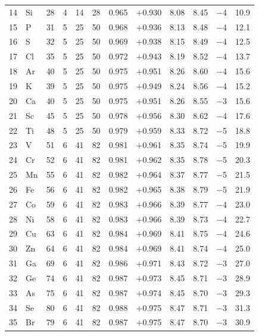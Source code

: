 \documentclass[twocolumn]{iopjournal}
\begin{document}
\begin{longtable}{r l r r r r r r r r r r}
14 & Si &  28 & 4 &  14 &  28 & 0.965 & $+$0.930 &  8.08 &  8.45 & $-$4  & 10.9 \\
15 & P  &  31 & 5 &  25 &  50 & 0.968 & $+$0.936 &  8.13 &  8.48 & $-$4  & 12.1 \\
16 & S  &  32 & 5 &  25 &  50 & 0.969 & $+$0.938 &  8.15 &  8.49 & $-$4  & 12.5 \\
17 & Cl &  35 & 5 &  25 &  50 & 0.972 & $+$0.943 &  8.19 &  8.52 & $-$4  & 13.7 \\
18 & Ar &  40 & 5 &  25 &  50 & 0.975 & $+$0.951 &  8.26 &  8.60 & $-$4  & 15.6 \\
19 & K  &  39 & 5 &  25 &  50 & 0.975 & $+$0.949 &  8.24 &  8.56 & $-$4  & 15.2 \\
20 & Ca &  40 & 5 &  25 &  50 & 0.975 & $+$0.951 &  8.26 &  8.55 & $-$3  & 15.6 \\
21 & Sc &  45 & 5 &  25 &  50 & 0.978 & $+$0.956 &  8.30 &  8.62 & $-$4  & 17.6 \\
22 & Ti &  48 & 5 &  25 &  50 & 0.979 & $+$0.959 &  8.33 &  8.72 & $-$5  & 18.8 \\
23 & V  &  51 & 6 &  41 &  82 & 0.981 & $+$0.961 &  8.35 &  8.74 & $-$5  & 19.9 \\
24 & Cr &  52 & 6 &  41 &  82 & 0.981 & $+$0.962 &  8.35 &  8.78 & $-$5  & 20.3 \\
25 & Mn &  55 & 6 &  41 &  82 & 0.982 & $+$0.964 &  8.37 &  8.77 & $-$5  & 21.5 \\
26 & Fe &  56 & 6 &  41 &  82 & 0.982 & $+$0.965 &  8.38 &  8.79 & $-$5  & 21.9 \\
27 & Co &  59 & 6 &  41 &  82 & 0.983 & $+$0.966 &  8.39 &  8.77 & $-$4  & 23.0 \\
28 & Ni &  58 & 6 &  41 &  82 & 0.983 & $+$0.966 &  8.39 &  8.73 & $-$4  & 22.7 \\
29 & Cu &  63 & 6 &  41 &  82 & 0.984 & $+$0.969 &  8.41 &  8.75 & $-$4  & 24.6 \\
30 & Zn &  64 & 6 &  41 &  82 & 0.984 & $+$0.969 &  8.41 &  8.74 & $-$4  & 25.0 \\
31 & Ga &  69 & 6 &  41 &  82 & 0.986 & $+$0.971 &  8.43 &  8.72 & $-$3  & 27.0 \\
32 & Ge &  74 & 6 &  41 &  82 & 0.987 & $+$0.973 &  8.45 &  8.71 & $-$3  & 28.9 \\
33 & As &  75 & 6 &  41 &  82 & 0.987 & $+$0.974 &  8.45 &  8.70 & $-$3  & 29.3 \\
34 & Se &  80 & 6 &  41 &  82 & 0.988 & $+$0.975 &  8.47 &  8.71 & $-$3  & 31.3 \\
35 & Br &  79 & 6 &  41 &  82 & 0.987 & $+$0.975 &  8.47 &  8.70 & $-$3  & 30.9 \\

\end{longtable}
\end{document}
